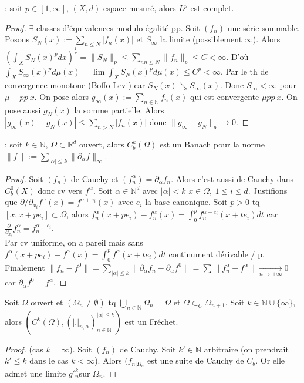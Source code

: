 \begin{ex}[Espaces $L^p$] : soit $p \in [1,\infty ]$, $(X,d)$ espace mesuré, alors $L^p$ est complet.
\end{ex}
\begin{proof}
    $\exists $ classes d'équivalences modulo égalité pp. Soit $(f_n)$ une série sommable. Posons $S_N(x):=\sum\limits_{n\le N}^{} |f_n(x)|$ et $S_\infty $ la limite (possiblement $\infty $). Alors $\left( \int_XS_N(x)^pdx \right) ^{\frac{1}{p}}=\|S_N\|_p\le \sum\limits_{nn\le N}^{} \|f_n\|_p\le C<\infty$. D'où $\int_XS_\infty (x)^pd\mu(x)=\lim\limits_{} \int_XS_N(x)^pd\mu(x)\le C^p<\infty $. Par le th de convergence monotone (Boffo Levi) car $S_N(x)\searrow S_\infty(x)$. Donc $S_\infty <\infty $ pour $\mu- pp\ x$. On pose alors $g_\infty (x):=\sum\limits_{n\in \mathbb{N} }^{} f_n(x)$ qui est convergente $\mu pp\ x$. On pose aussi $g_N(x)$ la somme partielle. Alors $|g_\infty(x) -g_N(x)|\le \sum\limits_{n>N}^{} |f_n(x)|$ donc $\|g_\infty -g_N\|_p\to 0$.
\end{proof}

\begin{ex} : soit $k\in \mathbb{N} $, $\Omega\subset \mathbb{R} ^d$ ouvert, alors $C^k_b(\Omega)$ est un Banach pour la norme $\|f\|:=\sum\limits_{|\alpha |\le k}^{} \|\partial_{\alpha }f\|_\infty $.
\end{ex}
\begin{proof}
    Soit $(f_n)$ de Cauchy et $(f_n^\alpha)=\partial_\alpha f_n$. Alors c'est aussi de Cauchy dans $C^0_b(X)$ donc cv vers $f^\alpha $. Soit $\alpha \in \mathbb{N} ^d$ avec $|\alpha |< k$ $x\in \Omega,\ 1\le i\le d$. Justifions que $\partial/\partial_{x_i}f^\alpha (x)=f^{\alpha+e_i}(x) $ avec $e_i$ la base canonique. Soit $p>0$ tq $[x,x+pe_i]\subset \Omega$, alors $f^\alpha _n(x+pe_i)-f^\alpha _n(x)=\int_0^pf_n^{\alpha +e_i}(x+te_i)dt$ car $\frac{\partial}{\partial_{x_i}}f_n^\alpha =f_n^{\alpha +e_i}$.\\
    Par cv uniforme, on a pareil mais sans \\
    $f^\alpha(x+pe_i)-f^\alpha(x)=\int_0^pf^{\alpha}(x+te_i)dt$ continument dérivable / p.\\
    Finalement $\|f_n-f^0\|=\sum\limits_{|\alpha |\le k}^{} \|\partial_\alpha f_n-\partial_\alpha f^0\|=\sum\limits_{}^{} \|f_n^\alpha -f^\alpha \| \underset{n\to +\infty}{\longrightarrow} 0$ car $\partial _\alpha f^0=f^\alpha $.
\end{proof}

\begin{ex}
    Soit $\Omega$ ouvert et $(\Omega_n\neq \emptyset )$ tq $\bigcup\limits_{n\in \mathbb{N} } \Omega_n=\Omega$ et $\overline{\Omega}\subset _C\Omega_{n+1}$. Soit $k\in \mathbb{N} \cup \{\infty \} $, alors $\left( C^k(\Omega),(|.|_{n,\alpha })_{n\in \mathbb{N} }^{|\alpha |\le k} \right) $ est un Fréchet.
\end{ex}
\begin{proof}
    (cas $k=\infty $). Soit $(f_n)$ de Cauchy. Soit $k'\in \mathbb{N} $ arbitraire (on prendrait $k'\le k$ dans le cas $k<\infty $). Alors $(f_{n|\Omega_n}$ est une suite de Cauchy de $C_b$. Or elle admet une limite $g'^k_n$sur $\Omega_n$.
\end{proof}


